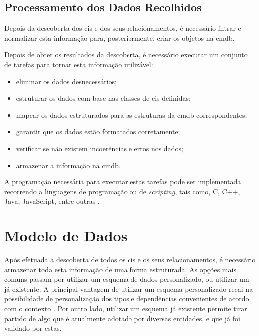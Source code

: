 \documentclass[
  oneside,
  11pt, a4paper,
  footinclude=true,
  headinclude=true,
  cleardoublepage=empty
]{scrbook}
\begin{document}
\subsection{Processamento dos Dados Recolhidos}

Depois da descoberta dos \glspl{ci} e dos seus relacionamentos, é necessário filtrar e normalizar esta informação para, posteriormente, criar os objetos na \gls{cmdb}.

Depois de obter os resultados da descoberta, é necessário executar um conjunto de tarefas para tornar esta informação utilizável:
\begin{itemize}
    \item eliminar os dados desnecessários;
    \item estruturar os dados com base nas classes de \glspl{ci} definidas;
    \item mapear os dados estruturados para as estruturas da \gls{cmdb} correspondentes;
    \item garantir que os dados estão formatados corretamente;
    \item verificar se não existem incoerências e erros nos dados;
    \item armazenar a informação na \gls{cmdb}.
\end{itemize}

A programação necessária para executar estas tarefas pode ser implementada recorrendo a linguagens de programação ou de \textit{scripting}, tais como, C, C++, Java, JavaScript, entre outras \cite{lin2019multi}.

\section{Modelo de Dados}

Após efetuada a descoberta de todos os \glspl{ci} e os seus relacionamentos, é necessário armazenar toda esta informação de uma forma estruturada. As opções mais comuns passam por utilizar um esquema de dados personalizado, ou utilizar um já existente. A principal vantagem de utilizar um esquema personalizado recai na possibilidade de personalização dos tipos e dependências convenientes de acordo com o contexto \cite{taddm}. Por outro lado, utilizar um esquema já existente permite tirar partido de algo que é atualmente adotado por diversas entidades, e que já foi validado por estas.
\end{document}
